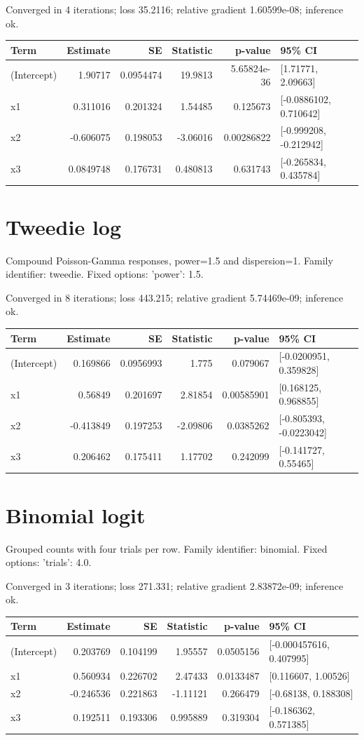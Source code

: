 \documentclass[11pt]{article}
\begin{document}
Converged in 4 iterations; loss 35.2116; relative gradient 1.60599e-08; inference ok.
\begin{center}\small\begin{tabular}{lrrrrl}\toprule
Term & Estimate & SE & Statistic & p-value & 95\% CI \\ \midrule
(Intercept) & 1.90717 & 0.0954474 & 19.9813 & 5.65824e-36 & [1.71771, 2.09663] \\
x1 & 0.311016 & 0.201324 & 1.54485 & 0.125673 & [-0.0886102, 0.710642] \\
x2 & -0.606075 & 0.198053 & -3.06016 & 0.00286822 & [-0.999208, -0.212942] \\
x3 & 0.0849748 & 0.176731 & 0.480813 & 0.631743 & [-0.265834, 0.435784] \\
\bottomrule\end{tabular}\end{center}
\section{Tweedie log}
Compound Poisson-Gamma responses, power=1.5 and dispersion=1. Family identifier: tweedie. Fixed options: {'power': 1.5}.

Converged in 8 iterations; loss 443.215; relative gradient 5.74469e-09; inference ok.
\begin{center}\small\begin{tabular}{lrrrrl}\toprule
Term & Estimate & SE & Statistic & p-value & 95\% CI \\ \midrule
(Intercept) & 0.169866 & 0.0956993 & 1.775 & 0.079067 & [-0.0200951, 0.359828] \\
x1 & 0.56849 & 0.201697 & 2.81854 & 0.00585901 & [0.168125, 0.968855] \\
x2 & -0.413849 & 0.197253 & -2.09806 & 0.0385262 & [-0.805393, -0.0223042] \\
x3 & 0.206462 & 0.175411 & 1.17702 & 0.242099 & [-0.141727, 0.55465] \\
\bottomrule\end{tabular}\end{center}
\section{Binomial logit}
Grouped counts with four trials per row. Family identifier: binomial. Fixed options: {'trials': 4.0}.

Converged in 3 iterations; loss 271.331; relative gradient 2.83872e-09; inference ok.
\begin{center}\small\begin{tabular}{lrrrrl}\toprule
Term & Estimate & SE & Statistic & p-value & 95\% CI \\ \midrule
(Intercept) & 0.203769 & 0.104199 & 1.95557 & 0.0505156 & [-0.000457616, 0.407995] \\
x1 & 0.560934 & 0.226702 & 2.47433 & 0.0133487 & [0.116607, 1.00526] \\
x2 & -0.246536 & 0.221863 & -1.11121 & 0.266479 & [-0.68138, 0.188308] \\
x3 & 0.192511 & 0.193306 & 0.995889 & 0.319304 & [-0.186362, 0.571385] \\
\bottomrule\end{tabular}\end{center}
\end{document}
